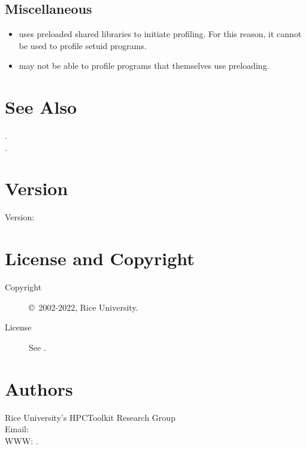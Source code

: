 \documentclass[english]{article}
\begin{document}
\subsection{Miscellaneous}

\begin{itemize}
  \item {} uses preloaded shared libraries to initiate profiling.  For this reason, it cannot be used to profile setuid programs.
  \item {} may not be able to profile programs that themselves use preloading.
\end{itemize}


\section{See Also}

.\\
.


\section{Version}

Version: \Version

\section{License and Copyright}

\begin{description}
\item[Copyright] \copyright\ 2002-2022, Rice University.
\item[License] See .
\end{description}

\section{Authors}

\noindent
Rice University's HPCToolkit Research Group \\
Email:  \\
WWW: .

\LatexManEnd
\end{document}
